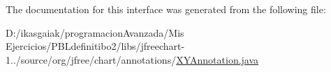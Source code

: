 The documentation for this interface was generated from the following file\+:\begin{DoxyCompactItemize}
\item 
D\+:/ikasgaiak/programacion\+Avanzada/\+Mis Ejercicios/\+P\+B\+Ldefinitibo2/libs/jfreechart-\/1../source/org/jfree/chart/annotations/\mbox{\hyperlink{_x_y_annotation_8java}{X\+Y\+Annotation.\+java}}\end{DoxyCompactItemize}
